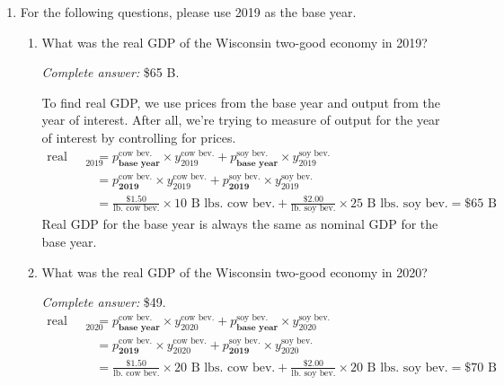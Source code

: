 \documentclass{assignment}
\begin{document}
\begin{enumerate}
\item For the following questions, please use 2019 as the base year.

\begin{enumerate}

\item What was the real GDP of the Wisconsin two-good economy in 2019?


\begin{solution}
\emph{Complete answer:} \$65 B.

To find real GDP, we use prices from the base year and output from the year of interest. After all, we're trying to measure of output for the year of interest by controlling for prices.
\begin{align*}
\text{real gdp}_{\text{2019}} &= 
p^{\text{cow~bev.}}_{\textbf{base year}} \times y^{\text{cow~bev.}}_{\text{2019}} +
p^{\text{soy~bev.}}_{\textbf{base year}} \times y^{\text{soy~bev.}}_{\text{2019}} \\
 &= 
p^{\text{cow~bev.}}_{\textbf{2019}} \times y^{\text{cow~bev.}}_{\text{2019}} +
p^{\text{soy~bev.}}_{\textbf{2019}} \times y^{\text{soy~bev.}}_{\text{2019}} \\
 &= \frac{\$1.50}{\text{lb.~cow~bev.}} \times 10 \text{~B~lbs.~cow~bev.} + \frac{\$2.00}{\text{lb.~soy~bev.}} \times 25 \text{~B~lbs.~soy~bev.} = \$65 \text{~B}
\end{align*}
Real GDP for the base year is always the same as nominal GDP for the base year.
\end{solution}

\item What was the real GDP of the Wisconsin two-good economy in 2020?

\begin{solution}
\emph{Complete answer:} \$49.
\begin{align*}
\text{real gdp}_{\text{2020}} &= 
p^{\text{cow~bev.}}_{\textbf{base year}} \times y^{\text{cow~bev.}}_{\text{2020}} +
p^{\text{soy~bev.}}_{\textbf{base year}} \times y^{\text{soy~bev.}}_{\text{2020}} \\
 &= 
p^{\text{cow~bev.}}_{\textbf{2019}} \times y^{\text{cow~bev.}}_{\text{2020}} +
p^{\text{soy~bev.}}_{\textbf{2019}} \times y^{\text{soy~bev.}}_{\text{2020}} \\
 &= \frac{\$1.50}{\text{lb.~cow~bev.}} \times 20 \text{~B~lbs.~cow~bev.} + \frac{\$2.00}{\text{lb.~soy~bev.}} \times 20 \text{~B~lbs.~soy~bev.} = \$70 \text{~B}
\end{align*}
\end{solution}


\end{enumerate}
\end{enumerate}
\end{document}
